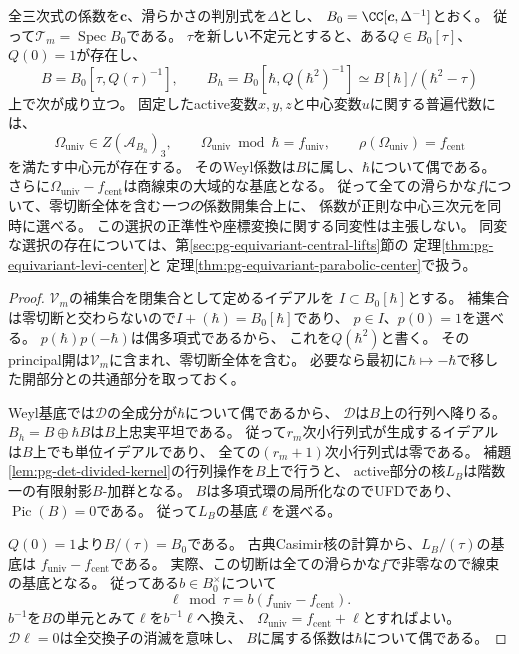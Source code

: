 \begin{theorem}[固定した変数分解の全係数空間における中心元]
\label{thm:pg-det-global-coefficient-lift}
全三次式の係数を$\boldsymbol c$、滑らかさの判別式を$\Delta$とし、
$B_0=\CC[\boldsymbol c,\Delta^{-1}]$とおく。
従って$\mathcal T_m=\operatorname{Spec}B_0$である。
$\tau$を新しい不定元とすると、ある$Q\in B_0[\tau]$、$Q(0)=1$が存在し、
\begin{equation}
 B=B_0[\tau,Q(\tau)^{-1}],\qquad
 B_h=B_0[\hbar,Q(\hbar^2)^{-1}]
 \simeq B[\hbar]/(\hbar^2-\tau)
 \label{eq:pg-det-even-coefficient-rings}
\end{equation}
上で次が成り立つ。
固定したactive変数$x,y,z$と中心変数$u$に関する普遍代数には、
\begin{equation}
 \Omega_{\mathrm{univ}}\in Z(\mathcal A_{B_h})_3,
 \qquad
 \Omega_{\mathrm{univ}}\bmod\hbar=f_{\mathrm{univ}},
 \qquad
 \rho(\Omega_{\mathrm{univ}})=f_{\mathrm{cent}}
 \label{eq:pg-det-global-center}
\end{equation}
を満たす中心元が存在する。
そのWeyl係数は$B$に属し、$\hbar$について偶である。
さらに$\Omega_{\mathrm{univ}}-f_{\mathrm{cent}}$は商線束の大域的な基底となる。
従って全ての滑らかな$f$について、零切断全体を含む\emph{一つの}係数開集合上に、
係数が正則な中心三次元を同時に選べる。
この選択の正準性や座標変換に関する同変性は主張しない。
同変な選択の存在については、第\ref{sec:pg-equivariant-central-lifts}節の
定理\ref{thm:pg-equivariant-levi-center}と
定理\ref{thm:pg-equivariant-parabolic-center}で扱う。
\end{theorem}
\begin{proof}
$\mathcal V_m$の補集合を閉集合として定めるイデアルを
$I\subset B_0[\hbar]$とする。
補集合は零切断と交わらないので$I+(\hbar)=B_0[\hbar]$であり、
$p\in I$、$p(0)=1$を選べる。
$p(\hbar)p(-\hbar)$は偶多項式であるから、
これを$Q(\hbar^2)$と書く。
そのprincipal開は$\mathcal V_m$に含まれ、零切断全体を含む。
必要なら最初に$\hbar\mapsto-\hbar$で移した開部分との共通部分を取っておく。

Weyl基底では$\mathcal D$の全成分が$\hbar$について偶であるから、
$\mathcal D$は$B$上の行列へ降りる。
$B_h=B\oplus\hbar B$は$B$上忠実平坦である。
従って$r_m$次小行列式が生成するイデアルは$B$上でも単位イデアルであり、
全ての$(r_m+1)$次小行列式は零である。
補題\ref{lem:pg-det-divided-kernel}の行列操作を$B$上で行うと、
active部分の核$L_B$は階数一の有限射影$B$-加群となる。
$B$は多項式環の局所化なのでUFDであり、
$\operatorname{Pic}(B)=0$である\cite[Tag~0BCH]{PStacks}。
従って$L_B$の基底$\ell$を選べる。

$Q(0)=1$より$B/(\tau)=B_0$である。
古典Casimir核の計算から、$L_B/(\tau)$の基底は
$f_{\mathrm{univ}}-f_{\mathrm{cent}}$である。
実際、この切断は全ての滑らかな$f$で非零なので線束の基底となる。
従ってある$b\in B_0^\times$について
\begin{equation}
 \ell\bmod\tau=b(f_{\mathrm{univ}}-f_{\mathrm{cent}}).
 \label{eq:pg-det-global-generator-normalization}
\end{equation}
$b^{-1}$を$B$の単元とみて$\ell$を$b^{-1}\ell$へ換え、
$\Omega_{\mathrm{univ}}=f_{\mathrm{cent}}+\ell$とすればよい。
$\mathcal D\ell=0$は全交換子の消滅を意味し、
$B$に属する係数は$\hbar$について偶である。
\end{proof}

